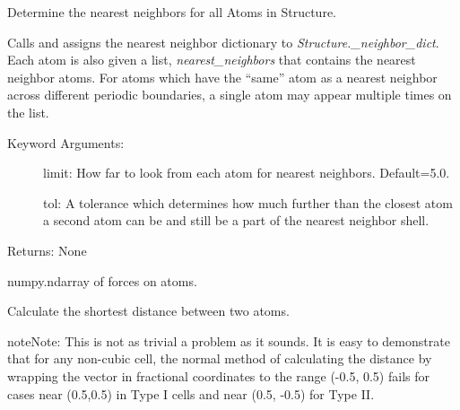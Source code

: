 \documentclass[letterpaper,10pt,english]{sphinxmanual}
\begin{document}
\begin{fulllineitems}
\begin{fulllineitems}
\label{models:qmpy.Structure.find_nearest_neighbors}
Determine the nearest neighbors for all Atoms in Structure.

Calls  and assigns the nearest
neighbor dictionary to \emph{Structure.\_neighbor\_dict}. Each atom is also
given a list, \emph{nearest\_neighbors} that contains the nearest neighbor
atoms. For atoms which have the ``same'' atom as a nearest neighbor across
different periodic boundaries, a single atom may appear multiple times
on the list.
\begin{description}
\item[{Keyword Arguments:}] \leavevmode
limit: How far to look from each atom for nearest neighbors.
Default=5.0.

tol: A tolerance which determines how much further than the closest
atom a second atom can be and still be a part of the nearest
neighbor shell.

\end{description}

Returns: None

\end{fulllineitems}


\begin{fulllineitems}
\label{models:qmpy.Structure.forces}
numpy.ndarray of forces on atoms.

\end{fulllineitems}


\begin{fulllineitems}
\label{models:qmpy.Structure.get_distance}
Calculate the shortest distance between two atoms.

\begin{notice}{note}{Note:}
This is not as trivial a problem as it sounds. It is easy to
demonstrate that for any non-cubic cell, the normal method of
calculating the distance by wrapping the vector in fractional
coordinates to the range (-0.5, 0.5) fails for cases near (0.5,0.5)
in Type I cells and near (0.5, -0.5) for Type II.


\end{notice}
\end{fulllineitems}
\end{fulllineitems}
\end{document}

